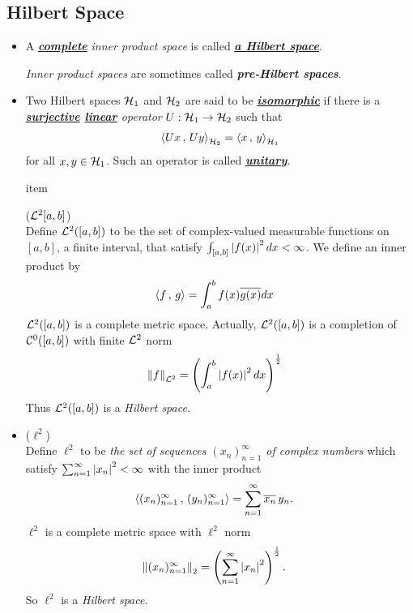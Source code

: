 \documentclass[11pt]{article}
\begin{document}
\subsection{Hilbert Space}
\begin{itemize}
\item \begin{definition}
A \underline{\textbf{\emph{complete}}} \emph{inner product space} is called \underline{\emph{\textbf{a Hilbert space}}}. 

\emph{Inner product spaces} are sometimes called \emph{\textbf{pre-Hilbert spaces}}.
\end{definition}

\item \begin{definition}
Two Hilbert spaces ${\mathcal H}_1$ and ${\mathcal H}_2$ are said to be \underline{\emph{\textbf{isomorphic}}} if there is a \emph{\textbf{\underline{surjective} \underline{linear}} operator} $U: {\mathcal H}_1 \rightarrow {\mathcal H}_2$ such that 
\begin{align*}
\left\langle Ux\,,\, Uy \right\rangle_{{\mathcal H}_2} = \left\langle x\,,\, y \right\rangle_{{\mathcal H}_1}
\end{align*}  for all $x, y \in {\mathcal H}_1$. Such an operator is called \underline{\emph{\textbf{unitary}}}.
\end{definition}

item \begin{example} (${\mathcal L}^2[a, b]$)\\
Define ${\mathcal L}^2([a, b])$ to be the set of complex-valued measurable functions on $[a, b]$, a finite interval, that satisfy $\int_{[a, b]} \left\lvert f(x) \right\rvert^2 dx < \infty$.
We define an inner product by
\begin{align*}
\left\langle f\,,\, g \right\rangle &= \int_{a}^{b}f(x)\overline{g(x)} dx
\end{align*} ${\mathcal L}^2([a, b])$ is a complete metric space. Actually, ${\mathcal L}^2([a,b])$ is a completion of ${\mathcal C}^{0}([a,b])$ with finite ${\mathcal L}^2$ norm
\begin{align*}
\left\|f\right\|_{{\mathcal L}^2} &= \left(\int_{a}^{b} \left\lvert f(x) \right\rvert^2 dx \right)^{\frac{1}{2}}
\end{align*} Thus ${\mathcal L}^2([a, b])$ is a \emph{Hilbert space}.
\end{example}

\item \begin{example} ($\ell^2$)\\
Define $\ell^2$ to be \emph{the set of sequences $(x_n)_{n=1}^{\infty}$ of complex numbers} which satisfy $\sum_{n= 1}^{\infty}\left\lvert x_n \right\rvert^2 < \infty$ with the inner product
\begin{align*}
\left\langle (x_n)_{n=1}^{\infty}\,,\, (y_n)_{n=1}^{\infty} \right\rangle &= \sum_{n= 1}^{\infty}\overline{x_n}\,y_n.
\end{align*} $\ell^2$ is a complete metric space with $\ell^2$ norm 
\begin{align*}
\left\|(x_n)_{n=1}^{\infty}\right\|_{2} &= \left(\sum_{n= 1}^{\infty}\left\lvert x_n \right\rvert^2\right)^{\frac{1}{2}}.
\end{align*} So $\ell^2$ is a \emph{Hilbert space}. 


\end{example}
\end{itemize}
\end{document}
